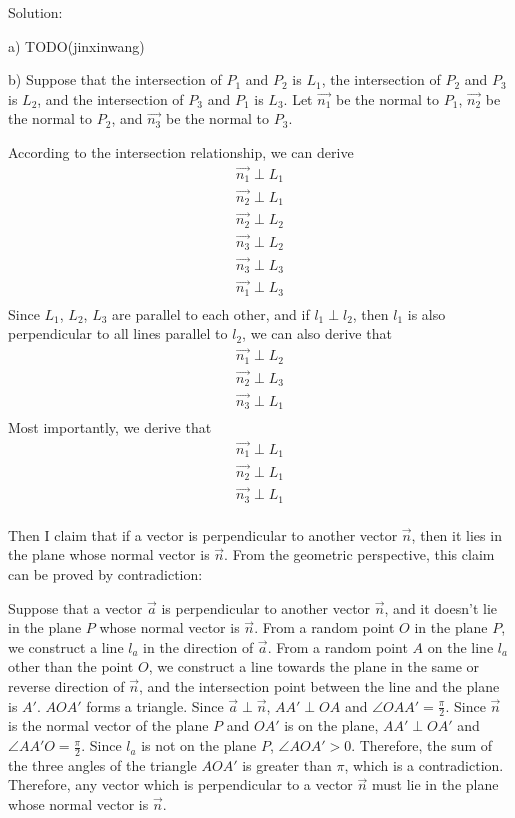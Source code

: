 \documentclass{article}
\begin{document}
Solution:

a) TODO(jinxinwang)

b) Suppose that the intersection of $P_1$ and $P_2$ is $L_1$, the intersection 
of $P_2$ and $P_3$ is $L_2$, and the intersection of $P_3$ and $P_1$ is $L_3$. 
Let $\vec{n_1}$ be the normal to $P_1$, $\vec{n_2}$ be the normal to $P_2$, and 
$\vec{n_3}$ be the normal to $P_3$.

According to the intersection relationship, we can derive
\begin{gather*}
  \vec{n_1} \perp L_1 \\
  \vec{n_2} \perp L_1 \\
  \vec{n_2} \perp L_2 \\
  \vec{n_3} \perp L_2 \\
  \vec{n_3} \perp L_3 \\
  \vec{n_1} \perp L_3 \\
\end{gather*}
Since $L_1$, $L_2$, $L_3$ are parallel to each other, and if $l_1 \perp l_2$, 
then $l_1$ is also perpendicular to all lines parallel to $l_2$, we can also 
derive that
\begin{gather*}
  \vec{n_1} \perp L_2 \\
  \vec{n_2} \perp L_3 \\
  \vec{n_3} \perp L_1 \\
\end{gather*}
Most importantly, we derive that
\begin{gather*}
  \vec{n_1} \perp L_1 \\
  \vec{n_2} \perp L_1 \\
  \vec{n_3} \perp L_1 \\
\end{gather*}

Then I claim that if a vector is perpendicular to another vector $\vec{n}$, then 
it lies in the plane whose normal vector is $\vec{n}$. From the geometric 
perspective, this claim can be proved by contradiction:

Suppose that a vector $\vec{a}$ is perpendicular to another vector $\vec{n}$, 
and it doesn't lie in the plane $P$ whose normal vector is $\vec{n}$. From a 
random point $O$ in the plane $P$, we construct a line $l_a$ in the direction of 
$\vec{a}$. From a random point $A$ on the line $l_a$ other than the point $O$, 
we construct a line towards the plane in the same or reverse direction of 
$\vec{n}$, and the intersection point between the line and the plane is $A'$. 
$AOA'$ forms a triangle. Since $\vec{a} \perp \vec{n}$, $AA' \perp OA$ and 
$\angle{OAA'} = \frac{\pi}{2}$. Since $\vec{n}$ is the normal vector of the 
plane $P$ and $OA'$ is on the plane, $AA' \perp OA'$ and 
$\angle{AA'O} = \frac{\pi}{2}$. Since $l_a$ is not on the plane $P$, 
$\angle{AOA'} > 0$. Therefore, the sum of the three angles of the triangle 
$AOA'$ is greater than $\pi$, which is a contradiction. Therefore, any vector 
which is perpendicular to a vector $\vec{n}$ must lie in the plane whose normal 
vector is $\vec{n}$.
\end{document}
